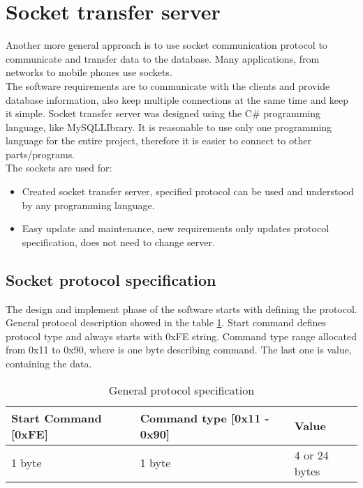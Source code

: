 %
\section{Socket transfer server}

Another more general approach is to use socket communication \cite{bib6} protocol to communicate and transfer data to the database. Many applications, from networks to mobile phones \cite{bib7} use sockets. \\  The software requirements are to communicate with the clients and provide database information, also keep multiple connections at the same time and keep it simple.  Socket transfer server was designed using the C\# programming language, like MySQLLIbrary. It is reasonable to use only one programming language for the entire project, therefore it is easier to connect to other parts/programs. \\ The sockets are used for: 

\begin{itemize}
	\item Created socket transfer server, specified protocol can be used and understood by any programming language.
	\item Easy update and maintenance, new requirements only updates protocol specification, does not need to change server.
\end{itemize}

\subsection{Socket protocol specification}

The design and implement phase of the software starts with defining the protocol. General protocol description showed in the table \ref{tab:protocolSpec}. Start command defines protocol type and always starts with 0xFE string. Command type range allocated from 0x11 to 0x90, where is one byte describing command. The last one is value, containing the data.

\begin{table}[h]
	\centering
    \begin{tabular}{ | p{4cm} | p{5cm} | p{4cm} | }
    \hline
    \textbf{Start Command} [0xFE] & \textbf{Command type} [0x11 - 0x90] & \textbf{Value}  \\ \hline
    1 byte & 1 byte & 4 or 24 bytes  \\ \hline
    \end{tabular}
	\caption{General protocol specification}
	\label{tab:protocolSpec}
\end{table}

